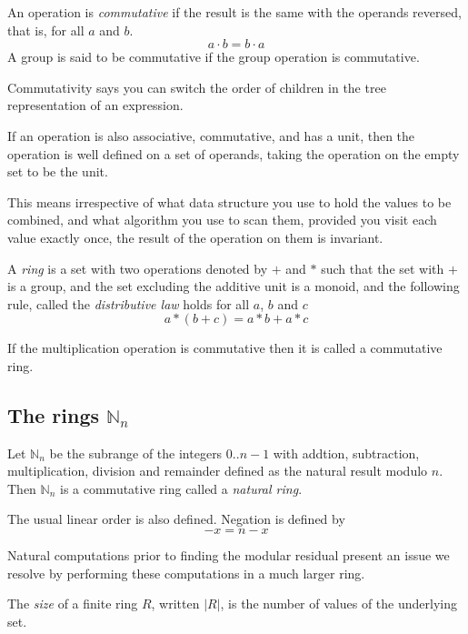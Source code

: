 \begin{definition}
An operation is {\em commutative} if the result is the same with the operands
reversed, that is, for all $a$ and $b$.
$$a \cdot b = b \cdot a$$
A group is said to be commutative if the group operation is commutative.
\end{definition}

Commutativity says you can switch the order of children in the tree representation
of an expression.

If an operation is also associative, commutative, and has a unit, then the operation
is well defined on a set of operands, taking the operation on the empty
set to be the unit. 

This means irrespective of what data structure you use to hold the
values to be combined, and what algorithm you use to scan them,
provided you visit each value exactly once, the result of the
operation on them is invariant.

\begin{definition}
A {\em ring} is a set with two operations denoted by $+$ and $*$ such
that the set with $+$ is a group, and the set excluding the additive
unit is a monoid, and the following rule, called the
{\em distributive law} holds for all $a$, $b$ and $c$
$$a * (b + c)  = a * b + a * c$$

If the multiplication operation is commutative then it is called
a commutative ring.
\end{definition}

\subsection{The rings $\mathbb{N}_n$}
\begin{definition}
Let $\mathbb{N}_n$ be the subrange of the integers $0..n-1$ with 
addtion, subtraction, 
multiplication, division and remainder defined as the natural result modulo $n$.
Then $\mathbb{N}_n$ is a commutative ring called a {\em natural ring}.
\end{definition}

The usual linear order is also defined.  Negation is defined by
$$-x = n - x$$

Natural computations prior to finding the modular residual present an issue
we resolve by performing these computations in a much larger ring.

\begin{definition}
The {\em size} of a finite ring $R$, written $|R|$, is the number of values of the underlying set.
\end{definition}
